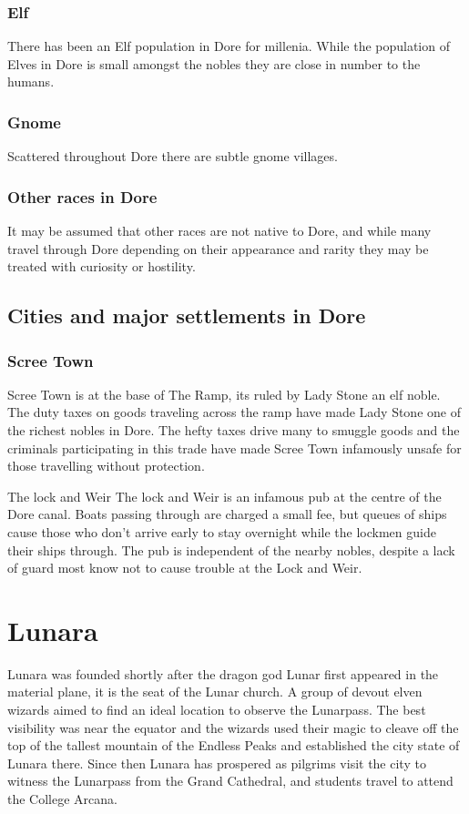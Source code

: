 \documentclass[10pt,twoside,twocolumn,openany,justified,bg=full,nomultitoc]{dndbook}
\begin{document}
\subsection{Elf}
\label{sec-4-1-4}
There has been an Elf population in Dore for millenia. While the population of Elves in Dore is small amongst the nobles they are close in number to the humans.
\subsection{Gnome}
\label{sec-4-1-5}
Scattered throughout Dore there are subtle gnome villages.
\subsection{Other races in Dore}
\label{sec-4-1-6}
It may be assumed that other races are not native to Dore, and while many travel through Dore depending on their appearance and rarity they may be treated with curiosity or hostility.

\section{Cities and major settlements in Dore}
\label{sec-4-2}
\subsection{Scree Town}
\label{sec-4-2-1}
Scree Town is at the base of The Ramp, its ruled by Lady Stone an elf noble. The duty taxes on goods traveling across the ramp have made Lady Stone one of the richest nobles in Dore. The hefty taxes drive many to smuggle goods and the criminals participating in this trade have made Scree Town infamously unsafe for those travelling without protection.

\begin{paperbox}[float=!t]{The lock and Weir}\label{The-lock-and-Weir}
The lock and Weir is an infamous pub at the centre of the Dore canal. Boats passing through are charged a small fee, but queues of ships cause those who don't arrive early to stay overnight while the lockmen guide their ships through. The pub is independent of the nearby nobles, despite a lack of guard most know not to cause trouble at the Lock and Weir.  
\end{paperbox}

\chapter{Lunara}
\label{sec-5}
Lunara was founded shortly after the dragon god Lunar first appeared in the material plane, it is the seat of the Lunar church. A group of devout elven wizards aimed to find an ideal location to observe the Lunarpass. The best visibility was near the equator and the wizards used their magic to cleave off the top of the tallest mountain of the Endless Peaks and established the city state of Lunara there. Since then Lunara has prospered as pilgrims visit the city to witness the Lunarpass from the Grand Cathedral, and students travel to attend the College Arcana.\\
\end{document}
